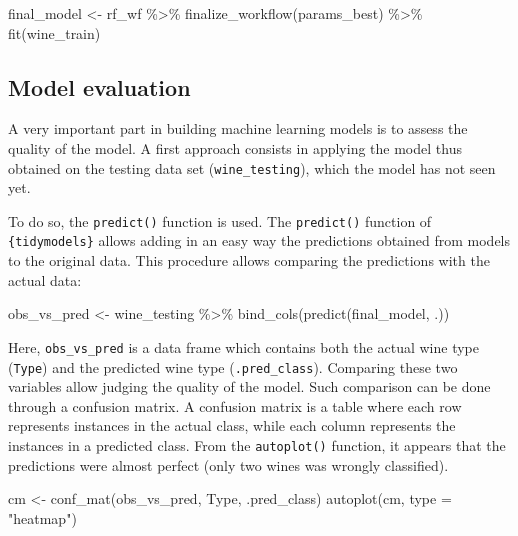 \documentclass[
]{krantz}
\makeatletter
\newenvironment{Shaded}{\begin{snugshade}}{\end{snugshade}}
\newcommand{\AttributeTok}[1]{\textcolor[rgb]{0.61,0.61,0.61}{#1}}
\newcommand{\FunctionTok}[1]{\textcolor[rgb]{0,0,0}{#1}}
\newcommand{\NormalTok}[1]{#1}
\newcommand{\OtherTok}[1]{\textcolor[rgb]{0.37,0.37,0.37}{#1}}
\newcommand{\SpecialCharTok}[1]{\textcolor[rgb]{0,0,0}{#1}}
\newcommand{\StringTok}[1]{\textcolor[rgb]{0.5,0.5,0.5}{#1}}
\newenvironment{kframe}{%
\medskip{}
\setlength{\fboxsep}{.8em}
 \def\at@end@of@kframe{}%
 \ifinner\ifhmode%
  \def\at@end@of@kframe{\end{minipage}}%
  \begin{minipage}{\columnwidth}%
 \fi\fi%
 \def\FrameCommand##1{\hskip\@totalleftmargin \hskip-\fboxsep
 \colorbox{shadecolor}{##1}\hskip-\fboxsep
     \hskip-\linewidth \hskip-\@totalleftmargin \hskip\columnwidth}%
 \MakeFramed {\advance\hsize-\width
   \@totalleftmargin\z@ \linewidth\hsize
   \@setminipage}}%
 {\par\unskip\endMakeFramed%
 \at@end@of@kframe}
\renewenvironment{Shaded}{\begin{kframe}}{\end{kframe}}
\makeatother
\begin{document}
\begin{Shaded}
\begin{Highlighting}[]
\NormalTok{final\_model }\OtherTok{\textless{}{-}}\NormalTok{ rf\_wf }\SpecialCharTok{\%\textgreater{}\%}
  \FunctionTok{finalize\_workflow}\NormalTok{(params\_best) }\SpecialCharTok{\%\textgreater{}\%}
  \FunctionTok{fit}\NormalTok{(wine\_train)}
\end{Highlighting}
\end{Shaded}

\hypertarget{model-evaluation}{%
\subsection{Model evaluation}\label{model-evaluation}}

A very important part in building machine learning models is to assess the quality of the model. A first approach consists in applying the model thus obtained on the testing data set (\texttt{wine\_testing}), which the model has not seen yet.

To do so, the \texttt{predict()} function is used. The \texttt{predict()} function of \texttt{\{tidymodels\}} allows adding in an easy way the predictions obtained from models to the original data. This procedure allows comparing the predictions with the actual data:

\begin{Shaded}
\begin{Highlighting}[]
\NormalTok{obs\_vs\_pred }\OtherTok{\textless{}{-}}\NormalTok{ wine\_testing }\SpecialCharTok{\%\textgreater{}\%}
  \FunctionTok{bind\_cols}\NormalTok{(}\FunctionTok{predict}\NormalTok{(final\_model, .))}
\end{Highlighting}
\end{Shaded}

Here, \texttt{obs\_vs\_pred} is a data frame which contains both the actual wine type (\texttt{Type}) and the predicted wine type (\texttt{.pred\_class}). Comparing these two variables allow judging the quality of the model. Such comparison can be done through a confusion matrix. A confusion matrix is a table where each row represents instances in the actual class, while each column represents the instances in a predicted class. From the \texttt{autoplot()} function, it appears that the predictions were almost perfect (only two wines was wrongly classified).

\begin{Shaded}
\begin{Highlighting}[]
\NormalTok{cm }\OtherTok{\textless{}{-}} \FunctionTok{conf\_mat}\NormalTok{(obs\_vs\_pred, Type, .pred\_class)}
\FunctionTok{autoplot}\NormalTok{(cm, }\AttributeTok{type =} \StringTok{"heatmap"}\NormalTok{)}
\end{Highlighting}
\end{Shaded}
\end{document}
